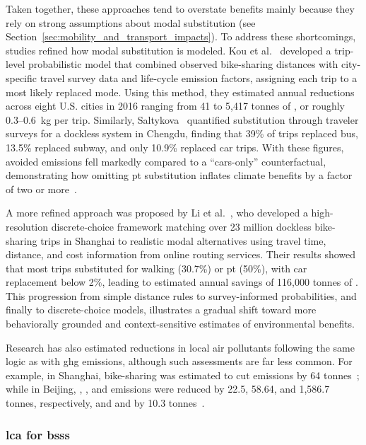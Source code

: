     Taken together, these approaches tend to overstate benefits mainly because they rely on strong assumptions about modal substitution (see Section~\ref{sec:mobility_and_transport_impacts}). To address these shortcomings, studies refined how modal substitution is modeled. Kou et al.~\cite{Kou2020} developed a trip-level probabilistic model that combined observed bike-sharing distances with city-specific travel survey data and life-cycle emission factors, assigning each trip to a most likely replaced mode. Using this method, they estimated annual reductions across eight U.S. cities in 2016 ranging from 41 to 5,417 tonnes of , or roughly 0.3--0.6~kg per trip. Similarly, Saltykova~\cite{Saltykova2022} quantified substitution through traveler surveys for a dockless system in Chengdu, finding that 39\% of trips replaced bus, 13.5\% replaced subway, and only 10.9\% replaced car trips. With these figures, avoided emissions fell markedly compared to a ``cars-only'' counterfactual, demonstrating how omitting \ac{pt} substitution inflates climate benefits by a factor of two or more~\cite{Saltykova2022}.

    A more refined approach was proposed by Li et al.~\cite{Liu2021}, who developed a high-resolution discrete-choice framework matching over 23 million dockless bike-sharing trips in Shanghai to realistic modal alternatives using travel time, distance, and cost information from online routing services. Their results showed that most trips substituted for walking (30.7\%) or \ac{pt} (50\%), with car replacement below 2\%, leading to estimated annual savings of 116,000 tonnes of . This progression from simple distance rules to survey-informed probabilities, and finally to discrete-choice models, illustrates a gradual shift toward more behaviorally grounded and context-sensitive estimates of environmental benefits.

    Research has also estimated reductions in local air pollutants following the same logic as with \ac{ghg} emissions, although such assessments are far less common. For example, in Shanghai, bike-sharing was estimated to cut  emissions by 64 tonnes~\cite{Zhang2018}; while in Beijing, , , and  emissions were reduced by 22.5, 58.64, and 1,586.7 tonnes, respectively, and  and  by 10.3 tonnes~\cite{Qiu2018}.


    \subsubsection[LCA for BSSs]{\ac{lca} for \acp{bss}}

